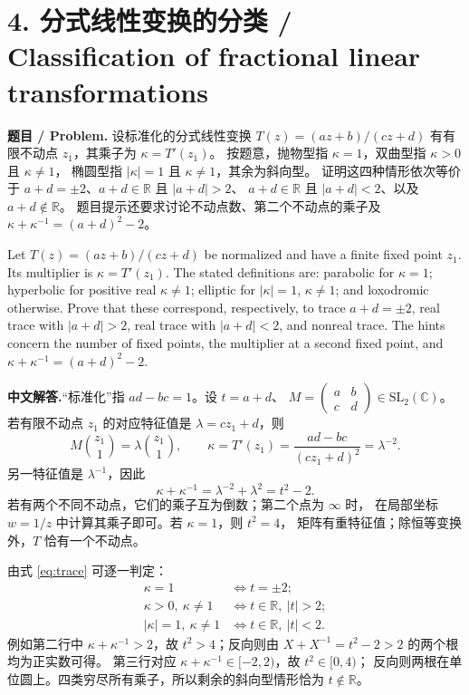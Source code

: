 \documentclass[11pt,a4paper]{ctexart}
\newcommand{\C}{\mathbb C}
\newcommand{\R}{\mathbb R}
\newcommand{\CN}{\textbf{中文解答.}\enspace}
\begin{document}
\section*{4. 分式线性变换的分类 / Classification of fractional linear transformations}
\textbf{题目 / Problem.} 设标准化的分式线性变换
$T(z)=(az+b)/(cz+d)$ 有有限不动点 $z_1$，其乘子为 $\kappa=T'(z_1)$。
按题意，抛物型指 $\kappa=1$，双曲型指 $\kappa>0$ 且 $\kappa\ne1$，
椭圆型指 $|\kappa|=1$ 且 $\kappa\ne1$，其余为斜向型。
证明这四种情形依次等价于 $a+d=\pm2$、$a+d\in\R$ 且 $|a+d|>2$、
$a+d\in\R$ 且 $|a+d|<2$、以及 $a+d\notin\R$。
题目提示还要求讨论不动点数、第二个不动点的乘子及
$\kappa+\kappa^{-1}=(a+d)^2-2$。

Let $T(z)=(az+b)/(cz+d)$ be normalized and have a finite fixed point $z_1$.
Its multiplier is $\kappa=T'(z_1)$. The stated definitions are:
parabolic for $\kappa=1$; hyperbolic for positive real $\kappa\ne1$;
elliptic for $|\kappa|=1$, $\kappa\ne1$; and loxodromic otherwise.
Prove that these correspond, respectively, to trace $a+d=\pm2$,
real trace with $|a+d|>2$, real trace with $|a+d|<2$, and nonreal trace.
The hints concern the number of fixed points, the multiplier at a second
fixed point, and $\kappa+\kappa^{-1}=(a+d)^2-2$.

\CN “标准化”指 $ad-bc=1$。设 $t=a+d$、
$M=\begin{pmatrix}a&b\\c&d\end{pmatrix}\in\mathrm{SL}_2(\C)$。
若有限不动点 $z_1$ 的对应特征值是 $\lambda=cz_1+d$，则
\[
 M\binom{z_1}{1}=\lambda\binom{z_1}{1},\qquad
 \kappa=T'(z_1)=\frac{ad-bc}{(cz_1+d)^2}=\lambda^{-2}.
\]
另一特征值是 $\lambda^{-1}$，因此
\begin{equation}\label{eq:trace}
 \boxed{\displaystyle \kappa+\kappa^{-1}
 =\lambda^{-2}+\lambda^2=t^2-2.}
\end{equation}
若有两个不同不动点，它们的乘子互为倒数；第二个点为 $\infty$ 时，
在局部坐标 $w=1/z$ 中计算其乘子即可。若 $\kappa=1$，则 $t^2=4$，
矩阵有重特征值；除恒等变换外，$T$ 恰有一个不动点。

由式 \eqref{eq:trace} 可逐一判定：
\begin{align*}
 \kappa=1
 &\iff t=\pm2;\\
 \kappa>0,\ \kappa\ne1
 &\iff t\in\R,\ |t|>2;\\
 |\kappa|=1,\ \kappa\ne1
 &\iff t\in\R,\ |t|<2.
\end{align*}
例如第二行中 $\kappa+\kappa^{-1}>2$，故 $t^2>4$；反向则由
$X+X^{-1}=t^2-2>2$ 的两个根均为正实数可得。
第三行对应 $\kappa+\kappa^{-1}\in[-2,2)$，故 $t^2\in[0,4)$；
反向则两根在单位圆上。四类穷尽所有乘子，所以剩余的斜向型情形恰为 $t\notin\R$。
\end{document}
